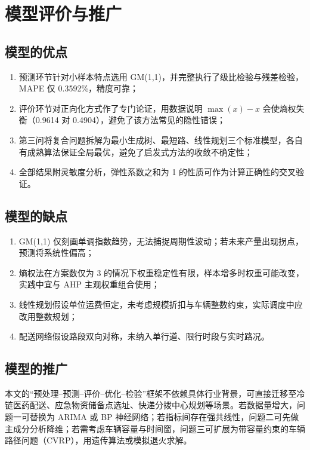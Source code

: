 \documentclass[12pt]{article}
\begin{document}
\FloatBarrier

\section{模型评价与推广}

\subsection{模型的优点}

\begin{enumerate}
  \item 预测环节针对小样本特点选用 GM(1,1)，并完整执行了级比检验与残差检验，MAPE 仅 0.3592\%，精度可靠；
  \item 评价环节对正向化方式作了专门论证，用数据说明 $\max(x)-x$ 会使熵权失衡（0.9614 对 0.4904），避免了该方法常见的隐性错误；
  \item 第三问将复合问题拆解为最小生成树、最短路、线性规划三个标准模型，各自有成熟算法保证全局最优，避免了启发式方法的收敛不确定性；
  \item 全部结果附灵敏度分析，弹性系数之和为 1 的性质可作为计算正确性的交叉验证。
\end{enumerate}

\subsection{模型的缺点}

\begin{enumerate}
  \item GM(1,1) 仅刻画单调指数趋势，无法捕捉周期性波动；若未来产量出现拐点，预测将系统性偏高；
  \item 熵权法在方案数仅为 3 的情况下权重稳定性有限，样本增多时权重可能改变，实践中宜与 AHP 主观权重组合使用；
  \item 线性规划假设单位运费恒定，未考虑规模折扣与车辆整数约束，实际调度中应改用整数规划；
  \item 配送网络假设路段双向对称，未纳入单行道、限行时段与实时路况。
\end{enumerate}

\subsection{模型的推广}

本文的“预处理--预测--评价--优化--检验”框架不依赖具体行业背景，可直接迁移至冷链医药配送、应急物资储备点选址、快递分拨中心规划等场景。若数据量增大，问题一可替换为 ARIMA 或 BP 神经网络；若指标间存在强共线性，问题二可先做主成分分析降维；若需考虑车辆容量与时间窗，问题三可扩展为带容量约束的车辆路径问题（CVRP），用遗传算法或模拟退火求解。
\end{document}

